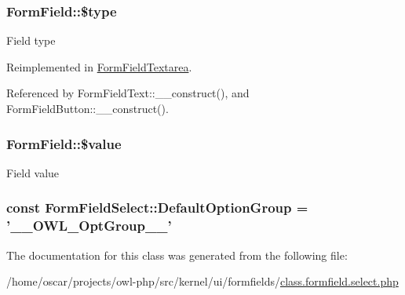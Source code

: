 \subsubsection[{\$type}]{\setlength{\rightskip}{0pt plus 5cm}FormField::\$type}\label{classFormField_a37bed21a1891e95be0e4a697e45ba51b}
Field type 

Reimplemented in \hyperlink{classFormFieldTextarea_a85348034822c70694fc8640bfcacc04d}{FormFieldTextarea}.



Referenced by FormFieldText::\_\-\_\-construct(), and FormFieldButton::\_\-\_\-construct().

\subsubsection[{\$value}]{\setlength{\rightskip}{0pt plus 5cm}FormField::\$value}\label{classFormField_a3c01e89834248eec8e2f145fbcfa0fbc}
Field value 
\subsubsection[{DefaultOptionGroup}]{\setlength{\rightskip}{0pt plus 5cm}const {\bf FormFieldSelect::DefaultOptionGroup} = '\_\-\_\-OWL\_\-OptGroup\_\-\_\-'}\label{classFormFieldSelect_a9f90f3ec8f40d0a3ac6b75194ab7415f}


The documentation for this class was generated from the following file:\begin{DoxyCompactItemize}
\item 
/home/oscar/projects/owl-\/php/src/kernel/ui/formfields/\hyperlink{class_8formfield_8select_8php}{class.formfield.select.php}\end{DoxyCompactItemize}
